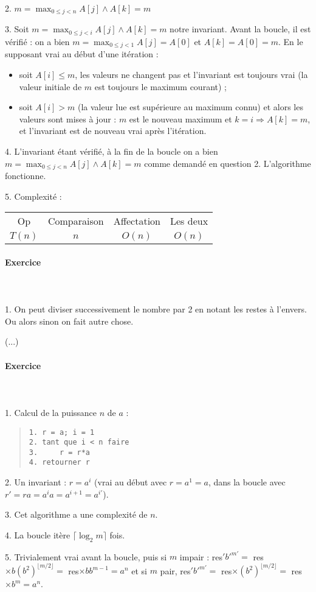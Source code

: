 \documentclass[a4paper]{article}
\newcounter{noexo}
\newcommand{\exo}{\stepcounter{noexo} \paragraph{Exercice \thenoexo} ~\\ ~\\}
\begin{document}
2. $m=\max_{0\leqslant j<n}A[j] \wedge A[k] = m$

3. Soit $m=\max_{0\leqslant j<i}A[j] \wedge A[k] = m$ notre invariant. Avant la boucle, il est vérifié : on a bien $m=\max_{0\leqslant j<1}A[j]=A[0]$ et $A[k]=A[0]=m$. En le supposant vrai au début d'une itération : \begin{itemize}
	\item soit $A[i]\leqslant m$, les valeurs ne changent pas et l'invariant est toujours vrai (la valeur initiale de $m$ est toujours le maximum courant) ;
	\item soit $A[i]>m$ (la valeur lue est supérieure au maximum connu) et alors les valeurs sont mises à jour : $m$ est le nouveau maximum et $k=i\Rightarrow A[k]=m$, et l'invariant est de nouveau vrai après l'itération.
\end{itemize}

4. L'invariant étant vérifié, à la fin de la boucle on a bien $m=\max_{0\leqslant j<n}A[j] \wedge A[k] = m$ comme demandé en question 2. L'algorithme fonctionne.

5. Complexité :\\
\begin{tabular}{c|ccc}
	Op & Comparaison & Affectation & Les deux \\
	$T(n)$ & $n$ & $O(n)$ & $O(n)$
\end{tabular}

\exo
1. On peut diviser successivement le nombre par 2 en notant les restes à l'envers. Ou alors sinon on fait autre chose.

(...)

\exo
1. Calcul de la puissance $n$ de $a$ :
\begin{quote}\begin{verbatim}
1. r = a; i = 1
2. tant que i < n faire
3.     r = r*a
4. retourner r
\end{verbatim}\end{quote}

2. Un invariant : $r=a^i$ (vrai au début avec $r=a^1=a$, dans la boucle avec $r'=ra=a^ia=a^{i+1}=a^{i'}$).

3. Cet algorithme a une complexité de $n$.

4. La boucle itère $\lceil\log_2 m\rceil$ fois.

5. Trivialement vrai avant la boucle, puis si $m$ impair : res$'b'^{m'}=$ res$\times b(b^2)^{\lfloor m/2\rfloor}=$ res$\times bb^{m-1}=a^n$ et si $m$ pair, res$'b'^{m'}=$ res$\times(b^2)^{\lfloor m/2\rfloor}=$ res$\times b^m=a^n$.
\end{document}
